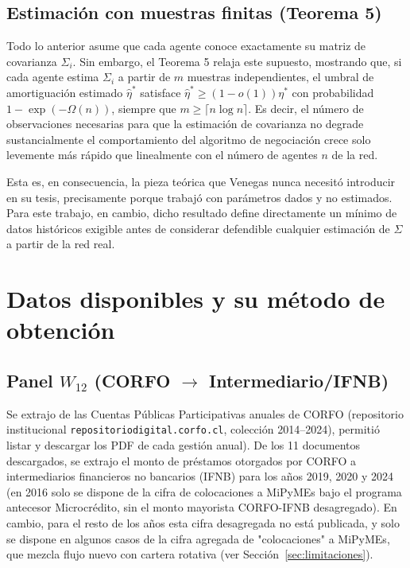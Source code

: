 \documentclass[11pt]{article}
\begin{document}
\subsection{Estimación con muestras finitas (Teorema 5)}
\label{sec:teorema5}

Todo lo anterior asume que cada agente conoce exactamente su matriz de covarianza $\Sigma_i$. Sin embargo, el Teorema 5 relaja este supuesto, mostrando que, si cada agente estima $\Sigma_i$ a partir de $m$ muestras independientes, el umbral de amortiguación estimado $\hat\eta^*$ satisface $\hat\eta^* \geq (1-o(1))\eta^*$ con probabilidad $1-\exp(-\Omega(n))$, siempre que $m \geq \lceil n\log n \rceil$. Es decir, el número de observaciones necesarias para que la estimación de covarianza no degrade sustancialmente el comportamiento del algoritmo de negociación crece solo levemente más rápido que linealmente con el número de agentes $n$ de la red.

Esta es, en consecuencia, la pieza teórica que Venegas nunca necesitó introducir en su tesis, precisamente porque trabajó con parámetros dados y no estimados. Para este trabajo, en cambio, dicho resultado define directamente un mínimo de datos históricos exigible antes de considerar defendible cualquier estimación de $\Sigma$ a partir de la red real.

\section{Datos disponibles y su método de obtención}
\label{sec:datos}

\subsection{Panel $W_{12}$ (CORFO $\to$ Intermediario/IFNB)}

Se extrajo de las Cuentas Públicas Participativas anuales de CORFO (repositorio institucional \texttt{repositoriodigital.corfo.cl}, colección 2014--2024), permitió listar y descargar los PDF de cada gestión anual). De los 11 documentos descargados, se extrajo el monto de préstamos otorgados por CORFO a intermediarios financieros no bancarios (IFNB) para los años 2019, 2020 y 2024 (en 2016 solo se dispone de la cifra de colocaciones a MiPyMEs bajo el programa antecesor Microcrédito, sin el monto mayorista CORFO-IFNB desagregado). En cambio, para el resto de los años esta cifra desagregada no está publicada, y solo se dispone en algunos casos de la cifra agregada de "colocaciones" a MiPyMEs, que mezcla flujo nuevo con cartera rotativa (ver Sección~\ref{sec:limitaciones}).
\end{document}

